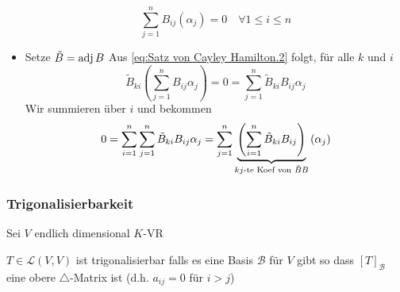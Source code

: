 \begin{subproof*}
\begin{itemize}
			\begin{equation}
				\label{eq:Satz von Cayley Hamilton.2}
				\tag{$ 2 $}
				\sum_{j=1}^{n} B_{ij} (\alpha_j) = 0 \quad \forall 1 \leq i \leq n
			\end{equation}
		\item Setze $ \tilde B = \operatorname{adj} B $ 
			Aus \eqref{eq:Satz von Cayley Hamilton.2} folgt, für alle $ k $ und $ i $ 
			\[
				\tilde B_{ki} \left( \sum_{j=1}^{n} B_{ij} \alpha_j \right) = 0 = \sum_{j=1}^{n} \tilde B_{ki} B_{ij} \alpha_j
			\]
			Wir summieren über $ i $ und bekommen
			\[
				0 = \sum_{i=1}^{n} \sum_{j=1}^{n} \tilde B_{ki} B_{ij} \alpha_j = \sum_{j=1}^{n} \underbrace{\left( \sum_{i=1}^{n} \tilde B_{ki} B_{ij}  \right) }_{\text{$ kj $-te Koef von $ \tilde B B $} } \left( \alpha_j \right) 
			\]
	\end{itemize}
\end{subproof*}

\subsubsection{Trigonalisierbarkeit}
Sei $ V $ endlich dimensional $ K $-VR
\begin{subdefinition}
	$ T \in \mathcal{L} (V, V) $ ist trigonalisierbar falls es eine Basis $ \mathcal{B}  $ für $ V $ gibt so dass $ [T]_\mathcal{B}  $ eine obere $ \triangle $-Matrix ist (d.h. $ a_{ij} = 0 $ für $ i > j $)
\end{subdefinition}

